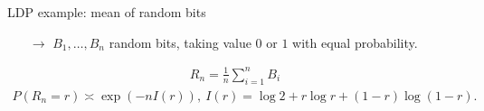 \documentclass{beamer}
\begin{document}
\begin{frame}[t]{LDP example: mean of random bits}

\begin{itemize}
  \item[$\rightarrow$] $B_1, \ldots, B_n$ random bits, taking value $0$ or $1$ with equal probability.
\end{itemize}

\begin{align*}
R_n = \frac{1}{n} \sum_{i=1}^n B_i
\end{align*}
\begin{align*}
P(R_n = r) \asymp \exp(- n I(r)),~ I(r) = \log 2 + r \log r + (1 - r) \log(1 - r).
\end{align*}



\end{frame}
\end{document}
